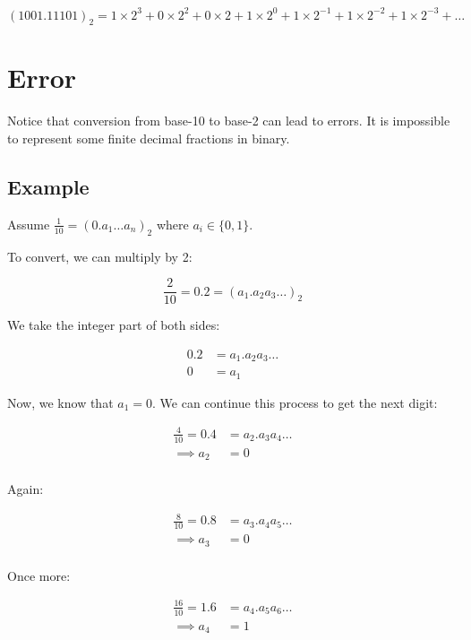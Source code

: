 \documentclass[12pt]{article}
\begin{document}
\begin{equation*}
  (1001.11101)_2 = 1\times 2^3 + 0\times 2^2 + 0\times 2 + 1\times 2^0 + 1\times 2^{-1} + 1\times 2^{-2} + 1\times 2^{-3} +\dots
\end{equation*}

\section{Error}

Notice that conversion from base-10 to base-2 can lead to errors. It is 
impossible to represent some finite decimal fractions in binary.

\subsection{Example}

Assume $\frac{1}{10} = (0.a_1 \dots a_n)_2$ where $a_i \in \{0, 1\}$.

To convert, we can multiply by 2:

\begin{equation*}
  \frac{2}{10} = 0.2 = (a_1 . a_2 a_3 \dots)_2
\end{equation*}

We take the integer part of both sides:

\begin{align*}
  0.2 &= a_1.a_2 a_3 \dots \\
  0 &= a_1
\end{align*}

Now, we know that $a_1 = 0$. We can continue this process to get the next
digit:

\begin{align*}
  \frac{4}{10} = 0.4 &= a_2.a_3 a_4 \dots \\
  \implies a_2 &= 0 \\
\end{align*}

Again:

\begin{align*}
  \frac{8}{10} = 0.8 &= a_3.a_4 a_5 \dots \\
  \implies a_3 &= 0 \\
\end{align*}

Once more:

\begin{align*}
  \frac{16}{10} = 1.6 &= a_4.a_5 a_6 \dots \\
  \implies a_4 &= 1 \\
\end{align*}
\end{document}

